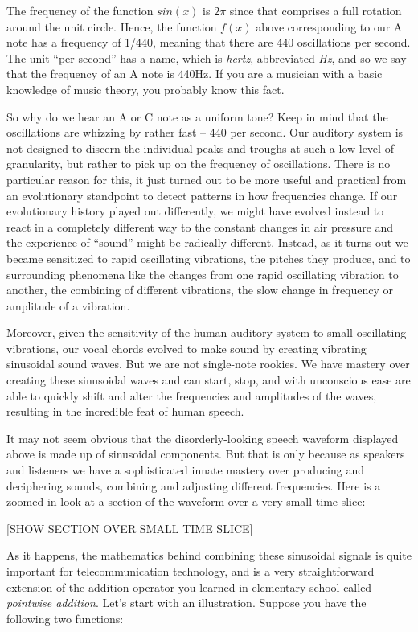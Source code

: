 \documentclass[UTF8]{book}
\begin{document}
\begin{CJK}{UTF8}{gbsn}
The frequency of the function $sin(x)$ is $2\pi$ since that comprises a full rotation around the unit circle. Hence, the function $f(x)$ above corresponding to our A note has a frequency of 1/440, meaning that there are 440 oscillations per second. The unit ``per second'' has a name, which is \emph{hertz}, abbreviated \emph{Hz}, and so we say that the frequency of an A note is 440Hz. If you are a musician with a basic knowledge of music theory, you probably know this fact.

So why do we hear an A or C note as a uniform tone? Keep in mind that the oscillations are whizzing by rather fast -- 440 per second. Our auditory system is not designed to discern the individual peaks and troughs at such a low level of granularity, but rather to pick up on the frequency of oscillations. There is no particular reason for this, it just turned out to be more useful and practical from an evolutionary standpoint to detect patterns in how frequencies change. If our evolutionary history played out differently, we might have evolved instead to react in a completely different way to the constant changes in air pressure and the experience of ``sound'' might be radically different. Instead, as it turns out we became sensitized to rapid oscillating vibrations, the pitches they produce, and to surrounding phenomena like the changes from one rapid oscillating vibration to another, the combining of different vibrations, the slow change in frequency or amplitude of a vibration.

Moreover, given the sensitivity of the human auditory system to small oscillating vibrations, our vocal chords evolved to make sound by creating vibrating sinusoidal sound waves. But we are not single-note rookies. We have mastery over creating these sinusoidal waves and can start, stop, and with unconscious ease are able to quickly shift and alter the frequencies and amplitudes of the waves, resulting in the incredible feat of human speech.

It may not seem obvious that the disorderly-looking speech waveform displayed above is made up of sinusoidal components. But that is only because as speakers and listeners we have a sophisticated innate mastery over producing and deciphering sounds, combining and adjusting different frequencies. Here is a zoomed in look at a section of the waveform over a very small time slice:

[SHOW SECTION OVER SMALL TIME SLICE]

As it happens, the mathematics behind combining these sinusoidal signals is quite important for telecommunication technology, and is a very straightforward extension of the addition operator you learned in elementary school called \emph{pointwise addition}. Let's start with an illustration. Suppose you have the following two functions:


\end{CJK}
\end{document}
